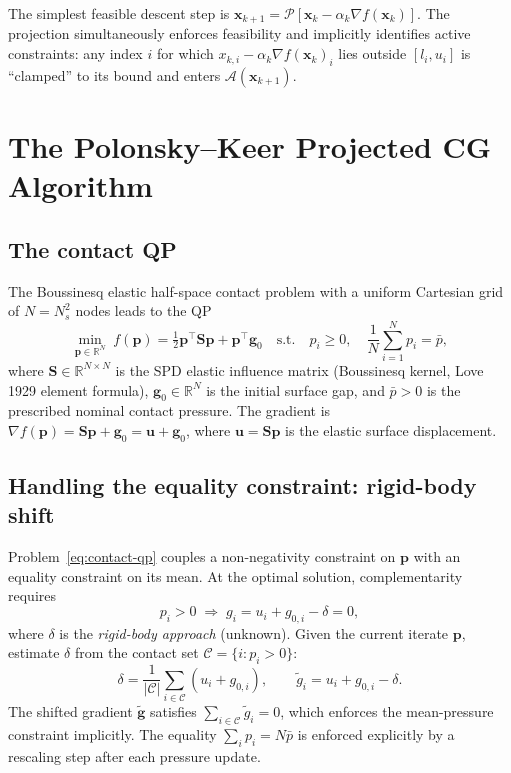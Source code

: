 \documentclass[11pt,a4paper]{article}
\newcommand{\R}{\mathbb{R}}
\newcommand{\bS}{\mathbf{S}}
\newcommand{\bp}{\mathbf{p}}
\newcommand{\bg}{\mathbf{g}}
\newcommand{\bu}{\mathbf{u}}
\newcommand{\bx}{\mathbf{x}}
\newcommand{\Proj}{\mathcal{P}}
\newcommand{\calC}{\mathcal{C}}
\newcommand{\calA}{\mathcal{A}}
\newcommand{\tr}{\top}
\begin{document}
The simplest feasible descent step is
$\bx_{k+1} = \Proj[\bx_k - \alpha_k\nabla f(\bx_k)]$.
The projection simultaneously enforces feasibility and implicitly identifies
active constraints: any index $i$ for which $x_{k,i} - \alpha_k\nabla f(\bx_k)_i$
lies outside $[l_i, u_i]$ is ``clamped'' to its bound and enters $\calA(\bx_{k+1})$.

\section{The Polonsky--Keer Projected CG Algorithm}
\label{sec:polonsky}

\subsection{The contact QP}

The Boussinesq elastic half-space contact problem with a uniform Cartesian grid
of $N = N_s^2$ nodes leads to the QP
\begin{equation}
  \min_{\bp \in \R^N}\; f(\bp) = \tfrac{1}{2}\bp^\tr\bS\bp + \bp^\tr\bg_0
  \quad \text{s.t.}\quad p_i \geq 0,\quad \frac{1}{N}\sum_{i=1}^N p_i = \bar p,
  \label{eq:contact-qp}
\end{equation}
where $\bS \in \R^{N\times N}$ is the SPD elastic influence matrix (Boussinesq
kernel, Love 1929 element formula), $\bg_0 \in \R^N$ is the initial surface gap,
and $\bar p > 0$ is the prescribed nominal contact pressure.
The gradient is $\nabla f(\bp) = \bS\bp + \bg_0 = \bu + \bg_0$,
where $\bu = \bS\bp$ is the elastic surface displacement.

\subsection{Handling the equality constraint: rigid-body shift}

Problem~\eqref{eq:contact-qp} couples a non-negativity constraint on $\bp$
with an equality constraint on its mean.
At the optimal solution, complementarity requires
\begin{equation}
  p_i > 0 \;\Rightarrow\; g_i = u_i + g_{0,i} - \delta = 0,
  \label{eq:complementarity}
\end{equation}
where $\delta$ is the \emph{rigid-body approach} (unknown).
Given the current iterate $\bp$, estimate $\delta$ from the contact set
$\calC = \{i : p_i > 0\}$:
\begin{equation}
  \delta = \frac{1}{|\calC|}\sum_{i \in \calC}(u_i + g_{0,i}),
  \qquad \tilde g_i = u_i + g_{0,i} - \delta.
  \label{eq:shift}
\end{equation}
The shifted gradient $\tilde{\bg}$ satisfies $\sum_{i\in\calC}\tilde g_i = 0$,
which enforces the mean-pressure constraint implicitly.
The equality $\sum_i p_i = N\bar p$ is enforced explicitly by a rescaling step
after each pressure update.
\end{document}
